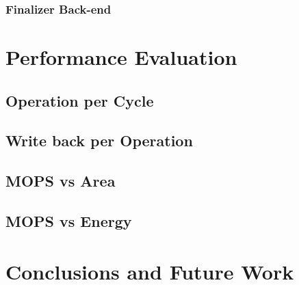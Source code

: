 \documentclass[12pt]{article}
\begin{document}
\begin{CJK}{UTF8}{bkai}
        \subsubsection{Finalizer Back-end}

\section{Performance Evaluation}
    \subsection{Operation per Cycle}
    \subsection{Write back per Operation}
    \subsection{MOPS vs Area}
    \subsection{MOPS vs Energy}

\section{Conclusions and Future Work}

\clearpage

\singlespacing

\printbibliography

\end{CJK}
\end{document}

